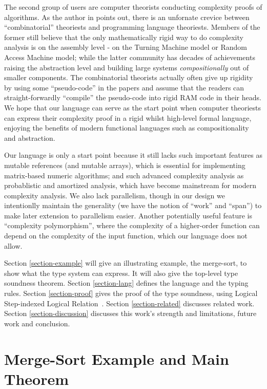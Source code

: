 \documentclass[preprint]{sigplanconf}
\begin{document}
The second group of users are computer theorists conducting complexity proofs of algorithms. As the author in \cite{harper2014proposal} points out, there is an unfornate crevice between ``combinatorial'' theoriests and programming language theoriests. Members of the former still believe that the only mathematically rigid way to do complexity analysis is on the assembly level - on the Turning Machine model or Random Access Machine model; while the latter community has decades of achievements raising the abstraction level and building large systems \emph{compositionally} out of smaller components. The combinatorial theorists actually often give up rigidity by using some ``pseudo-code'' in the papers and assume that the readers can straight-forwardly ``compile'' the pseudo-code into rigid RAM code in their heads. We hope that our language can serve as the start point when computer theoriests can express their complexity proof in a rigid whilst high-level formal language, enjoying the benefits of modern functional languages such as compositionality and abstraction. 

Our language is only a start point because it still lacks such important features as mutable references (and mutable arrays), which is essential for implementing matrix-based numeric algorithms; and such advanced complexity analysis as probablistic and amortized analysis, which have become mainstream for modern complexity analysis. We also lack parallelism, though in our design we intentionlly maintain the generality (we have the notion of ``work'' and ``span'') to make later extension to parallelism easier. Another potentially useful feature is ``complexity polymorphism'', where the complexity of a higher-order function can depend on the complexity of the input function, which our language does not allow.

Section \ref{section-example} will give an illustrating example, the merge-sort, to show what the type system can express. It will also give the top-level type soundness theorem. Section \ref{section-lang} defines the language and the typing rules. Section \ref{section-proof} gives the proof of the type soundness, using Logical Step-indexed Logical Relation~\cite{dreyer2009logical}. Section \ref{section-related} discusses related work. Section \ref{section-discussion} discusses this work's strength and limitations, future work and conclusion.

\section{\label{section-example}Merge-Sort Example and Main Theorem}
\end{document}
